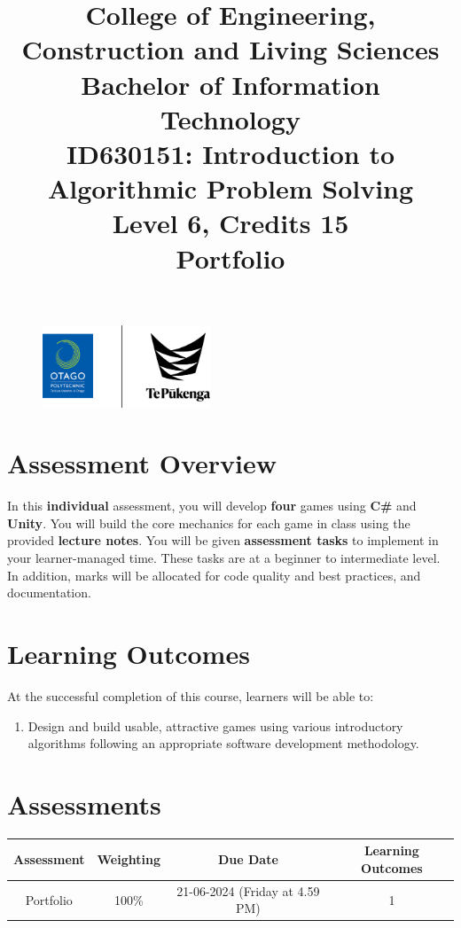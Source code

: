 \documentclass{article}
\author{}
\begin{document}
\begin{figure}
	\centering
	\includegraphics[width=50mm]{../../resources/img/logo.png}
\end{figure}

\title{College of Engineering, Construction and Living Sciences\\Bachelor of Information Technology\\ID630151: Introduction to Algorithmic Problem Solving\\Level 6, Credits 15\\\textbf{Portfolio}}
\date{}
\maketitle

\section*{Assessment Overview}
In this \textbf{individual} assessment, you will develop \textbf{four} games using \textbf{C\#} and \textbf{Unity}. You will build the core mechanics for each game in class using the provided \textbf{lecture notes}. You will be given \textbf{assessment tasks} to implement in your learner-managed time. These tasks are at a beginner to intermediate level. In addition, marks will be allocated for code quality and best practices, and documentation.

\section*{Learning Outcomes}
At the successful completion of this course, learners will be able to:
\begin{enumerate}
	\item Design and build usable, attractive games using various introductory algorithms following an appropriate software development methodology.
\end{enumerate}

\section*{Assessments}
\renewcommand{\arraystretch}{1.5}
\begin{tabular}{|c|c|c|c|}
	\hline
	\textbf{Assessment}                                 & \textbf{Weighting} & \textbf{Due Date}            & \textbf{Learning Outcomes} \\ \hline
	\small Portfolio                        & \small 100\%        & \small 21-06-2024 (Friday at 4.59 PM)  & \small 1                   \\ \hline
\end{tabular}
\end{document}
